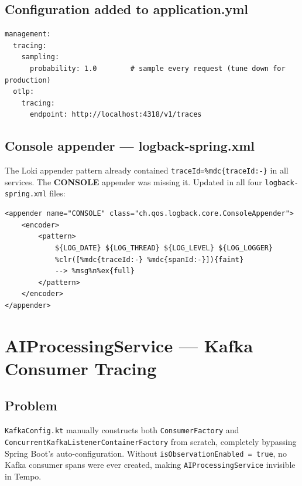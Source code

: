 \documentclass[11pt,a4paper]{article}
\begin{document}
\subsection{Configuration added to application.yml}

\begin{lstlisting}[style=yaml, caption={application.yml --- added to all 4 services}]
management:
  tracing:
    sampling:
      probability: 1.0        # sample every request (tune down for production)
  otlp:
    tracing:
      endpoint: http://localhost:4318/v1/traces
\end{lstlisting}

\subsection{Console appender --- logback-spring.xml}

The Loki appender pattern already contained \texttt{traceId=\%mdc\{traceId:-\}}
in all services.  The \textbf{CONSOLE} appender was missing it. Updated in all
four \texttt{logback-spring.xml} files:

\begin{lstlisting}[style=xml, caption={logback-spring.xml --- CONSOLE appender (all 4 services)}]
<appender name="CONSOLE" class="ch.qos.logback.core.ConsoleAppender">
    <encoder>
        <pattern>
            ${LOG_DATE} ${LOG_THREAD} ${LOG_LEVEL} ${LOG_LOGGER}
            %clr([%mdc{traceId:-} %mdc{spanId:-}]){faint}
            --> %msg%n%ex{full}
        </pattern>
    </encoder>
</appender>
\end{lstlisting}

\section{AIProcessingService --- Kafka Consumer Tracing}

\subsection{Problem}

\texttt{KafkaConfig.kt} manually constructs both \texttt{ConsumerFactory} and
\texttt{ConcurrentKafkaListenerContainerFactory} from scratch, completely
bypassing Spring Boot's auto-configuration.  Without
\texttt{isObservationEnabled = true}, no Kafka consumer spans were ever created,
making \texttt{AIProcessingService} invisible in Tempo.
\end{document}
